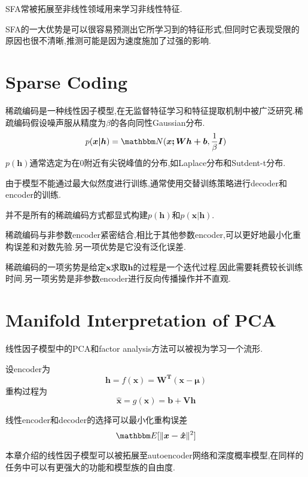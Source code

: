 SFA常被拓展至非线性领域用来学习非线性特征.

SFA的一大优势是可以很容易预测出它所学习到的特征形式,但同时它表现受限的原因也很不清晰,推测可能是因为速度施加了过强的影响.

\section{Sparse Coding}

稀疏编码是一种线性因子模型,在无监督特征学习和特征提取机制中被广泛研究.稀疏编码假设噪声服从精度为$\beta$的各向同性Gaussian分布.
\begin{equation}
p(\bm{x|h})=\mathbbm N(\bm{x;Wh+b},\frac{1}{\beta}\bm I)
\end{equation}
$p(\bm h)$通常选定为在$0$附近有尖锐峰值的分布,如Laplace分布和Sutdent-t分布.

由于模型不能通过最大似然度进行训练,通常使用交替训练策略进行decoder和encoder的训练.

并不是所有的稀疏编码方式都显式构建$p(\bm h)$和$p(\bm{x|h})$.

稀疏编码与非参数encoder紧密结合,相比于其他参数encoder,可以更好地最小化重构误差和对数先验.另一项优势是它没有泛化误差.

稀疏编码的一项劣势是给定$\bm x$求取$\bm h$的过程是一个迭代过程,因此需要耗费较长训练时间.另一项劣势是非参数encoder进行反向传播操作并不直观.

\section{Manifold Interpretation of PCA}

线性因子模型中的PCA和factor analysis方法可以被视为学习一个流形.

设encoder为
\begin{equation}
\bm h=f(\bm x)=\bm{W^T(x-\bm\mu)}
\end{equation}
重构过程为
\begin{equation}
\hat{\bm x}=g(\bm x)=\bm{b+Vh}
\end{equation}

线性encoder和decoder的选择可以最小化重构误差
\begin{equation}
\mathbbm E[\|\bm{x-\hat x}\|^2]
\end{equation}

本章介绍的线性因子模型可以被拓展至autoencoder网络和深度概率模型,在同样的任务中可以有更强大的功能和模型族的自由度.